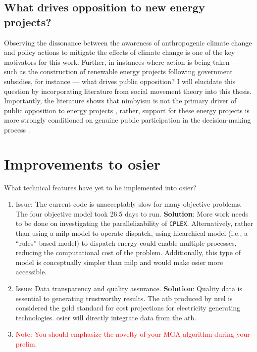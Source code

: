 \subsection{What drives opposition to new energy projects?}
Observing the dissonance between the awareness of anthropogenic climate change
and policy actions to mitigate the effects of climate change is one of the key
motivators for this work. Further, in instances where action is being taken ---
such as the construction of renewable energy projects following government
subsidies, for instance --- what drives public opposition? I will elucidate this
question by incorporating literature from social movement theory
\cite{mcadam_social_2017} into this thesis. Importantly, the literature shows
that \ac{nimbyism} is not the primary driver of public opposition to energy
projects \cite{konisky_proximity_2021}, rather, support for these energy
projects is more strongly conditioned on genuine public participation in the
decision-making process \cite{summers_influencing_2020,ottinger_procedural_2014,
walker_procedural_2017,barragan-contreras_procedural_2022,gonyo_resident_2021}.


\section{Improvements to \ac{osier}}

What technical features have yet to be implemented into \ac{osier}?
\begin{enumerate}
    \item Issue: The current code is unacceptably slow for many-objective
    problems. The four objective model took 26.5 days to run. \textbf{Solution}:
    More work needs to be done on investigating the parallelizability of
    \texttt{CPLEX}. Alternatively, rather than using a \ac{milp} model to
    operate dispatch, using hiearchical model (i.e., a ``rules'' based model) to
    dispatch energy could enable multiple processes, reducing the computational
    cost of the problem. Additionally, this type of model is conceptually
    simpler than \ac{milp} and would make \ac{osier} more accessible.
    \item Issue: Data transparency and quality assurance. \textbf{Solution}:
    Quality data is essential to generating trustworthy results. The \ac{atb}
    produced by \ac{nrel} is considered the gold standard for cost projections
    for electricity generating technologies. \ac{osier} will directly integrate
    data from the \ac{atb}.
    \item \textcolor{red}{Note: You should emphasize the novelty of your MGA
    algorithm during your prelim.}
\end{enumerate}

